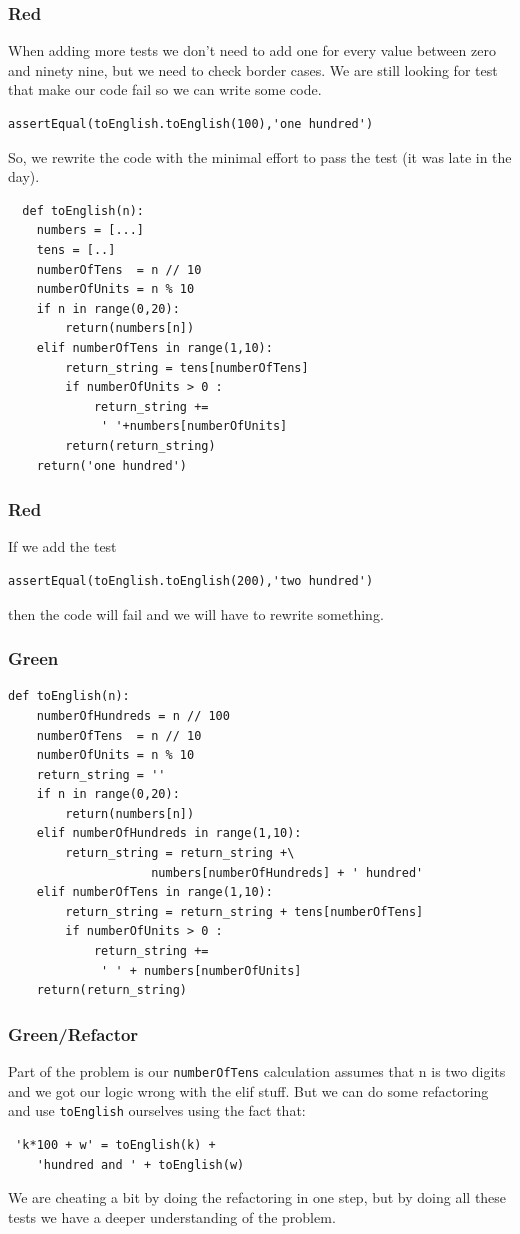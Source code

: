 \documentclass{beamer}
\begin{document}
\begin{frame}[fragile]
\frametitle{Red}
When adding more tests we don't need to add one for every value between
zero and ninety nine, but we need to check border cases. We are still
looking for test that make our code fail so we can write some code.
\begin{lstlisting}
assertEqual(toEnglish.toEnglish(100),'one hundred')
\end{lstlisting}
\end{frame}
\begin{frame}[fragile]
So, we rewrite the code with the minimal effort to pass the test (it
was late in the day).
\begin{lstlisting}
  def toEnglish(n):
    numbers = [...]
    tens = [..] 
    numberOfTens  = n // 10
    numberOfUnits = n % 10
    if n in range(0,20):
        return(numbers[n])
    elif numberOfTens in range(1,10):
        return_string = tens[numberOfTens]
        if numberOfUnits > 0 :
            return_string += 
             ' '+numbers[numberOfUnits]
        return(return_string)
    return('one hundred')
\end{lstlisting}
\end{frame}
\begin{frame}[fragile]
\frametitle{Red}
If we add the test
\begin{lstlisting}
assertEqual(toEnglish.toEnglish(200),'two hundred')
\end{lstlisting}
then the code will fail and we will have to rewrite something.
\end{frame}
\begin{frame}[fragile]
\frametitle{Green}
\begin{lstlisting}[basicstyle=\fontsize{9}{9}\selectfont]
  def toEnglish(n):
    numberOfHundreds = n // 100
    numberOfTens  = n // 10
    numberOfUnits = n % 10
    return_string = ''
    if n in range(0,20):
        return(numbers[n])
    elif numberOfHundreds in range(1,10):
        return_string = return_string +\
                    numbers[numberOfHundreds] + ' hundred'
    elif numberOfTens in range(1,10):
        return_string = return_string + tens[numberOfTens]
        if numberOfUnits > 0 :
            return_string += 
             ' ' + numbers[numberOfUnits]
    return(return_string)
\end{lstlisting}

\end{frame}
\begin{frame}[fragile]
  \frametitle{Green/Refactor}
Part of the problem is our \texttt{numberOfTens} calculation assumes that n is
two digits and we got our logic wrong with the elif stuff. But we can
do some refactoring and use \texttt{toEnglish} ourselves using the fact that:
\begin{lstlisting}
 'k*100 + w' = toEnglish(k) +
    'hundred and ' + toEnglish(w)  
\end{lstlisting}

We are cheating a bit by doing the refactoring in one step, but by
doing all these tests we have a deeper understanding of the problem.

\end{frame}
\end{document}
